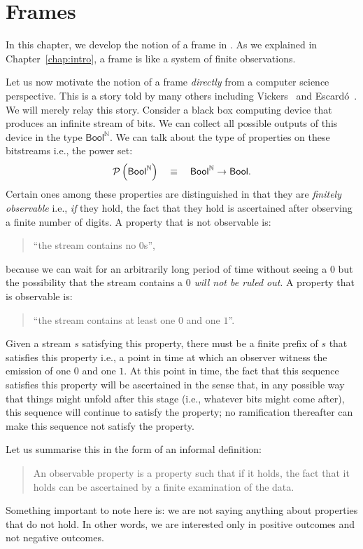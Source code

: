 \chapter{Frames}\label{chap:frames}

In this chapter, we develop the notion of a frame in \UF{}. As we explained in
Chapter~\ref{chap:intro}, a frame is like a system of finite observations.

Let us now motivate the notion of a frame \emph{directly} from a computer science
perspective. This is a story told by many others including Vickers~\cite{vickers} and
Escardó~\cite{synthetic-topology}. We will merely relay this story. Consider a black box
computing device that produces an infinite stream of bits. We can collect all possible
outputs of this device in the type $\mathsf{Bool}^{\mathbb{N}}$. We can talk about the
type of properties on these bitstreams i.e., the power set:
\begin{equation*}
  \mathcal{P}\left(\mathsf{Bool}^{\mathbb{N}}\right) \quad\equiv\quad \mathsf{Bool}^{\mathbb{N}} \rightarrow \mathsf{Bool}.
\end{equation*}
Certain ones among these properties are distinguished in that they are \emph{finitely
observable} i.e., \emph{if} they hold, the fact that they hold is ascertained after
observing a finite number of digits. A property that is not observable is:
\begin{quote}
  ``the stream contains no $0$s'',
\end{quote}
because we can wait for an arbitrarily long period of time without seeing a $0$ but the
possibility that the stream contains a $0$ \emph{will not be ruled out}. A property that
is observable is:
\begin{quote}
  ``the stream contains at least one $0$ and one $1$''.
\end{quote}
Given a stream $s$ satisfying this property, there must be a finite prefix of $s$ that
satisfies this property i.e., a point in time at which an observer witness the emission of
one $0$ and one $1$. At this point in time, the fact that this sequence satisfies this
property will be ascertained in the sense that, in any possible way that things might
unfold after this stage (i.e., whatever bits might come after), this sequence will
continue to satisfy the property; no ramification thereafter can make this sequence not
satisfy the property.

Let us summarise this in the form of an informal definition:
\begin{quote}
  An observable property is a property such that if it holds, the fact that it holds can
  be ascertained by a finite examination of the data.
\end{quote}
Something important to note here is: we are not saying anything about properties that do
not hold. In other words, we are interested only in positive outcomes and not negative
outcomes.

